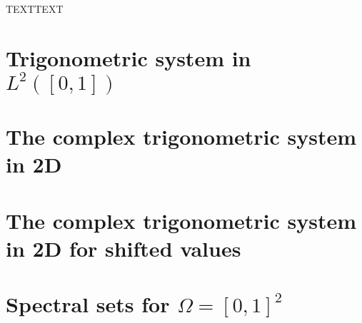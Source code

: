 \documentclass[../thesis.tex]{subfiles}
\begin{document}
TEXTTEXT


\section[]{Trigonometric system in $L^2([0,1])$}\label{sec:complx_trig_1d}
    


\section[]{The complex trigonometric system in 2D}\label{sec:complx_trig_2d}
    

\section{The complex trigonometric system in 2D for shifted values}
    



\section[]{Spectral sets for $\Omega = [0,1]^2$}
\end{document}
